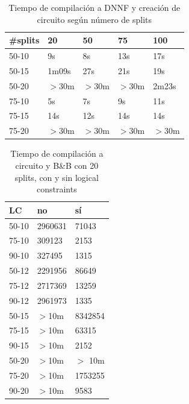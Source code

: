 \documentclass[11pt, letterpaper]{article}
\begin{document}
\begin{table}
\begin{center}
  \begin{tabular}{l | l | l | l | l}
    \hline
\#splits & 20 & 50 & 75 & 100 \\
    \hline
50-10 & 9s & 8s & 13s & 17s \\
50-15 & 1m09s & 27s & 21s & 19s \\
50-20 & $>$30m & $>$30m & $>$30m & 2m23s \\
75-10 & 5s & 7s & 9s & 11s  \\
75-15 & 14s & 12s & 14s & 14s \\
75-20 & $>$30m & $>$30m & $>$30m & $>$30m \\
  \end{tabular}
  \caption{Tiempo de compilación a DNNF y creación de circuito según número de splits}
\end{center}
\end{table}

\begin{table}
\begin{center}
  \begin{tabular}{l | l | l}
    \hline
    LC & no & sí \\
    \hline
    50-10 & 2960631 & 71043 \\
    75-10 & 309123 & 2153 \\
    90-10 & 327495 & 1315 \\
    50-12 & 2291956 & 86649 \\
    75-12 & 2717369 & 13259 \\
    90-12 & 2961973 & 1335 \\
    50-15 & $>$10m & 8342854 \\
    75-15 & $>$10m & 63315 \\
    90-15 & $>$10m & 2152 \\
    50-20 & $>$10m & $>$ 10m \\
    75-20 & $>$10m & 1753255 \\
    90-20 & $>$10m & 9583
  \end{tabular}
  \caption{Tiempo de compilación a circuito y B\&B con 20 splits, con y sin logical constraints}
\end{center}
\end{table}
\end{document}
